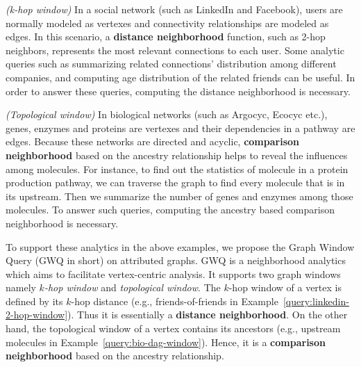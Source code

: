 \begin{example}
\label{query:linkedin-2-hop-window}
\emph{(k-hop window)} In a social network (such as LinkedIn and Facebook), users are normally modeled as vertexes and connectivity relationships are modeled as edges. 
In this scenario, a \textbf{distance neighborhood} function, such as 2-hop neighbors, represents
the most relevant connections to each user.
Some analytic queries such as summarizing
related connections' distribution among different companies, and computing age distribution of the related friends can be useful. In order to answer these queries, computing the distance neighborhood is necessary.
\end{example}

\begin{example}
\label{query:bio-dag-window}
\emph{(Topological window)} In biological networks (such as Argocyc, Ecocyc etc.\cite{keseler2005ecocyc}), genes, enzymes and proteins are vertexes and their dependencies in a pathway are edges. Because these networks are directed 
and acyclic, \textbf{comparison neighborhood} based on the ancestry relationship 
helps to reveal the influences among molecules. For instance, to find out the statistics of molecule in a protein 
production pathway, we can traverse the graph to find 
every molecule that is in its upstream. Then we summarize the number of genes and enzymes among those molecules. To answer such queries, computing the ancestry based comparison neighborhood is necessary. 
\end{example}

To support these analytics in the above examples, we propose the Graph Window Query (GWQ in short) 
on attributed graphs. GWQ is a neighborhood analytics which aims to facilitate vertex-centric analysis.
It supports two graph windows namely \emph{$k$-hop window} and \emph{topological window}. 
The $k$-hop window of a vertex is defined by its $k$-hop distance 
(e.g., friends-of-friends in Example~\ref{query:linkedin-2-hop-window}). Thus it is essentially
a \textbf{distance neighborhood}.  On the other hand, the topological window of
a vertex contains its ancestors (e.g., upstream molecules in Example~\ref{query:bio-dag-window}).
Hence, it is a \textbf{comparison neighborhood} based on the ancestry relationship. 



